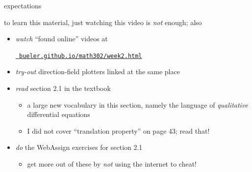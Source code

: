 \documentclass[colorlinks]{beamer}
\begin{document}
\begin{frame}{expectations}

to learn this material, just watching this video is \emph{not} enough; also
\begin{itemize}
\item \emph{watch} ``found online'' videos at

\centerline{\href{https://bueler.github.io/math302/week2.html}{\tt \color{cyan} bueler.github.io/math302/week2.html}}
\item \emph{try-out} direction-field plotters linked at the same place
\item \emph{read} section 2.1 in the textbook
    \begin{itemize}
    \item a large new vocabulary in this section, namely the language of \emph{qualitative} differential equations
    \item I did not cover ``translation property'' on page 43; read that!
    \end{itemize}
\item \emph{do} the WebAssign exercises for section 2.1
    \begin{itemize}
    \item get more out of these by \emph{not} using the internet to cheat!
    \end{itemize}
\end{itemize}
\end{frame}
\end{document}
